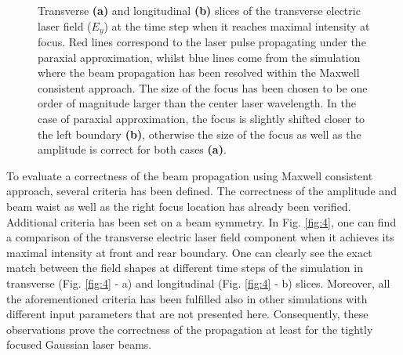 \begin{figure}[h!]
	\centering
	\hspace{1mm}
	\caption{Transverse \textbf{(a)} and longitudinal \textbf{(b)} slices of the transverse electric laser field ($ E_{y} $) at the time step when it reaches maximal intensity at focus. Red lines correspond to the laser pulse propagating under the paraxial approximation, whilst blue lines come from the simulation where the beam propagation has been resolved within the Maxwell consistent approach. The size of the focus has been chosen to be one order of magnitude larger than the center laser wavelength. In the case of paraxial approximation, the focus is slightly shifted closer to the left boundary \textbf{(b)}, otherwise the size of the focus as well as the amplitude is correct for both cases \textbf{(a)}.}
	\label{fig:6}
\end{figure}

To evaluate a correctness of the beam propagation using Maxwell consistent approach, several criteria has been defined. The correctness of the amplitude and beam waist as well as the right focus location has already been verified. Additional criteria has been set on a beam symmetry. In Fig. \ref{fig:4}, one can find a comparison of the transverse electric laser field component when it achieves its maximal intensity at front and rear boundary. One can clearly see the exact match between the field shapes at different time steps of the simulation in transverse (Fig. \ref{fig:4} - a) and longitudinal (Fig. \ref{fig:4} - b) slices. Moreover, all the aforementioned criteria has been fulfilled also in other simulations with different input parameters that are not presented here. Consequently, these observations prove the correctness of the propagation at least for the tightly focused Gaussian laser beams.

